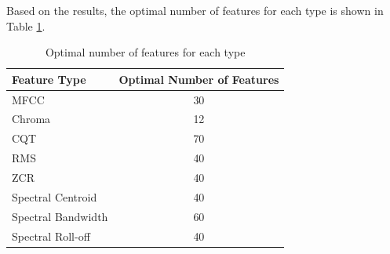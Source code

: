 Based on the results, the optimal number of features for each type is shown in Table \ref{tab:optimal_features}.
\begin{table}[h]
    \centering
    \small
    \begin{tabular}{|lc|}
        \hline
        \textbf{Feature Type} & \textbf{Optimal Number of Features} \\
        \hline
        MFCC                  & 30                                  \\
        Chroma                & 12                                  \\
        CQT                   & 70                                  \\
        RMS                   & 40                                  \\
        ZCR                   & 40                                  \\
        Spectral Centroid     & 40                                  \\
        Spectral Bandwidth    & 60                                  \\
        Spectral Roll-off     & 40                                  \\
        \hline
    \end{tabular}
    \caption{Optimal number of features for each type}
    \label{tab:optimal_features}
\end{table}